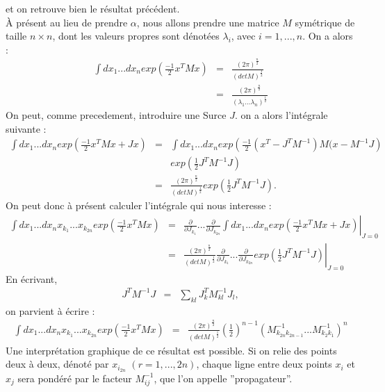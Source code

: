 \documentclass[a4paper,11pt]{article} %
\theoremstyle{plain}
\theoremstyle{definition}
\theoremstyle{remark}
\numberwithin{equation}{section}
\numberwithin{equation}{subsection}
\numberwithin{figure}{section}
\begin{document}
et on retrouve bien le résultat précédent.\\
À présent au lieu de prendre $\alpha$, nous allons prendre une matrice $M$ symétrique de taille $n \times n$, dont les valeurs propres 
sont dénotées $\lambda_{i}$, avec $i= 1, ..., n$. On a alors :
\begin{eqnarray*}
 \int dx_{1}  ...  dx_{n} exp \left( \frac{-1}{2} x^{T} M x \right) &=&  
\frac{ \left(2 \pi \right)^{\frac{n}{2} }  }{ \left( det M \right)^{\frac{1}{2}} } \\
                                                                    &=&   
\frac{ \left(2 \pi \right)^{\frac{n}{2} }  }{ \left( \lambda_{1} ... \lambda_{n}  \right)^{\frac{1}{2}} }
\end{eqnarray*}
On peut, comme precedement, introduire une Surce $J$. on a alors l'intégrale suivante :
\begin{eqnarray*}
 \int dx_{1}  ...  dx_{n}   exp \left( \frac{-1}{2} x^{T} M x  + Jx \right) &=&   \int dx_{1}  ...  dx_{n} 
exp \left( \frac{-1}{2} (x^{T} - J^{T} M^{-1} ) M ( x - M^{-1} J \right) \nonumber \\  && exp \left( \frac{1}{2} J^{T} M^{-1} J \right)  \\
                                                                            &=&  
\frac{ \left(2 \pi \right)^{\frac{n}{2} }  }{ \left( det M \right)^{\frac{1}{2}} } exp \left( \frac{1}{2} J^{T} M^{-1} J \right)   .
\end{eqnarray*}
On peut donc à présent calculer l'intégrale qui nous interesse :
\begin{eqnarray*}
 \int dx_{1}  ...  dx_{n} x_{k_{1}}  ...  x_{k_{2n}}   exp \left( \frac{-1}{2} x^{T} M x  \right) &=&   \left.
\frac{\partial}{\partial J_{k_{1}}}   ...   \frac{\partial}{\partial J_{k_{2n}}} 
\int dx_{1}  ...  dx_{n} exp \left( \frac{-1}{2} x^{T} M x  + Jx \right)   \right |_{J=0}   \nonumber  \\
                                &=& \left.  \frac{ \left(2 \pi \right)^{\frac{n}{2} }  }{ \left( det M \right)^{\frac{1}{2}} }
\frac{\partial}{\partial J_{k_{1}}}   ...   \frac{\partial}{\partial J_{k_{2n}}} 
exp \left( \frac{1}{2} J^{T} M^{-1} J \right)   \right |_{J=0}
\end{eqnarray*}
En écrivant,
\begin{eqnarray*}
 J^{T} M^{-1} J &=& \sum_{kl}   J^{T}_{k}  M^{-1}_{kl}   J_{l},
\end{eqnarray*}
on parvient à écrire :
\begin{eqnarray*}
 \int dx_{1}  ...  dx_{n} x_{k_{1}}  ...  x_{k_{2n}}   exp \left( \frac{-1}{2} x^{T} M x  \right) &=&
\frac{ \left(2 \pi \right)^{\frac{n}{2} }  }{ \left( det M \right)^{\frac{1}{2}} } 
\left( \frac{1}{2} \right)^{n-1}
\left(  M^{-1}_{k_{2n} k_{2n-1} }  ...  M^{-1}_{k_{2} k_{1} } \right)^{n} \nonumber
\end{eqnarray*}
Une interprétation graphique de ce résultat est possible. Si on relie des points deux à deux, dénoté par $x_{i_{2n}}$ $(r=1, ..., 2n)$, 
chaque ligne entre deux points $x_{i}$ et $x_{j}$ sera pondéré par le facteur $M^{-1}_{ij}$, que l'on appelle ''propagateur''.
\end{document}
